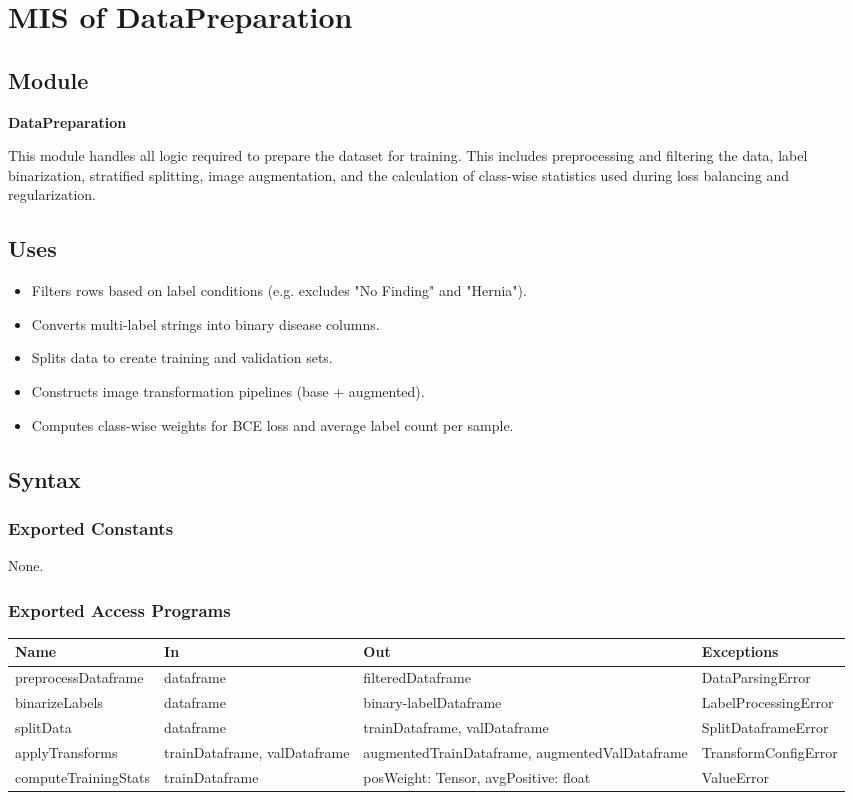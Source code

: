 \documentclass[12pt, titlepage]{article}
\begin{document}
\section{MIS of DataPreparation}

\subsection{Module}
\textbf{DataPreparation}

This module handles all logic required to prepare the dataset for training. This includes preprocessing and filtering the data, label binarization, stratified splitting, image augmentation, and the calculation of class-wise statistics used during loss balancing and regularization.

\subsection{Uses}
\begin{itemize}
    \item Filters rows based on label conditions (e.g. excludes "No Finding" and "Hernia").
    \item Converts multi-label strings into binary disease columns.
    \item Splits data to create training and validation sets.
    \item Constructs image transformation pipelines (base + augmented).
    \item Computes class-wise weights for BCE loss and average label count per sample.
\end{itemize}

\subsection{Syntax}

\subsubsection{Exported Constants}
None.

\subsubsection{Exported Access Programs}
\begin{tabular}{|l|l|l|l|}
\hline
\textbf{Name} & \textbf{In} & \textbf{Out} & \textbf{Exceptions} \\
\hline
preprocessDataframe & dataframe & filteredDataframe & DataParsingError \\
binarizeLabels & dataframe & binary-labelDataframe & LabelProcessingError \\
splitData & dataframe & trainDataframe, valDataframe & SplitDataframeError \\
applyTransforms & trainDataframe, valDataframe & augmentedTrainDataframe, augmentedValDataframe & TransformConfigError \\
computeTrainingStats & trainDataframe & posWeight: Tensor, avgPositive: float & ValueError \\
\hline
\end{tabular}
\end{document}
